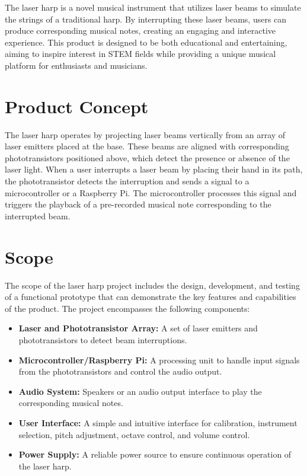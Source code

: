 The laser harp is a novel musical instrument that utilizes laser beams to simulate the strings of a traditional harp. By interrupting these laser beams, users can produce corresponding musical notes, creating an engaging and interactive experience. This product is designed to be both educational and entertaining, aiming to inspire interest in STEM fields while providing a unique musical platform for enthusiasts and musicians.

\section{Product Concept}

The laser harp operates by projecting laser beams vertically from an array of laser emitters placed at the base. These beams are aligned with corresponding phototransistors positioned above, which detect the presence or absence of the laser light. When a user interrupts a laser beam by placing their hand in its path, the phototransistor detects the interruption and sends a signal to a microcontroller or a Raspberry Pi. The microcontroller processes this signal and triggers the playback of a pre-recorded musical note corresponding to the interrupted beam.

\section{Scope}

The scope of the laser harp project includes the design, development, and testing of a functional prototype that can demonstrate the key features and capabilities of the product. The project encompasses the following components:
\begin{itemize}
    \item \textbf{Laser and Phototransistor Array:} A set of laser emitters and phototransistors to detect beam interruptions.
    \item \textbf{Microcontroller/Raspberry Pi:} A processing unit to handle input signals from the phototransistors and control the audio output.
    \item \textbf{Audio System:} Speakers or an audio output interface to play the corresponding musical notes.
    \item \textbf{User Interface:} A simple and intuitive interface for calibration, instrument selection, pitch adjustment, octave control, and volume control.
    \item \textbf{Power Supply:} A reliable power source to ensure continuous operation of the laser harp.
\end{itemize}

